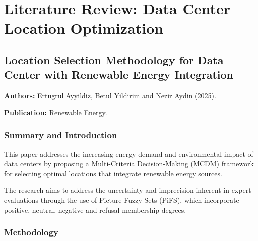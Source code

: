 \section{Literature Review: Data Center Location Optimization}



\subsection{Location Selection Methodology for Data Center with Renewable Energy Integration}
\label{sec:dc_paper_1}

\noindent
\textbf{Authors:} Ertugrul Ayyildiz, Betul Yildirim and Nezir Aydin (2025).

\noindent
\textbf{Publication:} Renewable Energy.

\subsubsection{Summary and Introduction}

This paper addresses the increasing energy demand and environmental impact of data centers by proposing a Multi-Criteria Decision-Making (MCDM) framework for selecting optimal locations that integrate renewable energy sources.

The research aims to address the uncertainty and imprecision inherent in expert evaluations through the use of Picture Fuzzy Sets (PiFS), which incorporate positive, neutral, negative and refusal membership degrees.

\subsubsection{Methodology}

